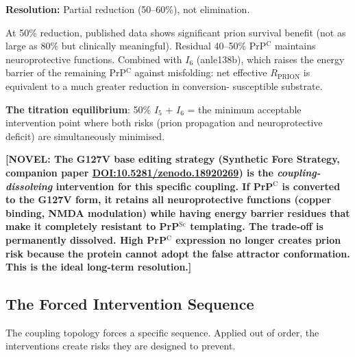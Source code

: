 \documentclass[12pt,a4paper]{article}
\newcommand{\rprion}{$R_{\mathrm{PRION}}$}
\newcommand{\prpc}{PrP$^{\mathrm{C}}$}
\newcommand{\prpsc}{PrP$^{\mathrm{Sc}}$}
\newcommand{\novel}[1]{\textbf{[NOVEL: #1]}}
\newcommand{\Inet}[1]{$I_{#1}$}
\begin{document}
\textbf{Resolution:} Partial reduction (50--60\%), not elimination.

At 50\% reduction, published data shows significant prion survival benefit
(not as large as 80\% but clinically meaningful). Residual 40--50\% \prpc{}
maintains neuroprotective functions. Combined with \Inet{6} (anle138b), which
raises the energy barrier of the remaining \prpc{} against misfolding: net
effective \rprion{} is equivalent to a much greater reduction in conversion-
susceptible substrate.

\textbf{The titration equilibrium}: 50\% \Inet{5} + \Inet{6} = the minimum
acceptable intervention point where both risks (prion propagation and
neuroprotective deficit) are simultaneously minimised.

\novel{The G127V base editing strategy (Synthetic Fore Strategy, companion
paper \href{https://doi.org/10.5281/zenodo.18920269}{DOI:10.5281/zenodo.18920269})
is the \textit{coupling-dissolving} intervention for this specific coupling.
If \prpc{} is converted to the G127V form, it retains all neuroprotective
functions (copper binding, NMDA modulation) while having energy barrier
residues that make it completely resistant to \prpsc{} templating. The
trade-off is permanently dissolved. High \prpc{} expression no longer creates
prion risk because the protein cannot adopt the false attractor conformation.
This is the ideal long-term resolution.}

\subsection{The Forced Intervention Sequence}

The coupling topology forces a specific sequence. Applied out of order, the
interventions create risks they are designed to prevent.
\end{document}
